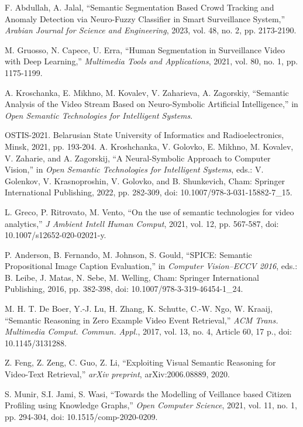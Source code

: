 \documentclass{article}
\begin{document}
\begin{multicols}{2}
\begin{thebibliography}{99}
F. Abdullah, A. Jalal, ``Semantic Segmentation Based Crowd Tracking and Anomaly Detection via Neuro-Fuzzy Classifier in Smart Surveillance System,'' \textit{Arabian Journal for Science and Engineering}, 2023, vol. 48, no. 2, pp. 2173-2190.

M. Gruosso, N. Capece, U. Erra, ``Human Segmentation in Surveillance Video with Deep Learning,'' \textit{Multimedia Tools and Applications}, 2021, vol. 80, no. 1, pp. 1175-1199.

A. Kroschanka, E. Mikhno, M. Kovalev, V. Zaharieva, A. Zagorskiy, ``Semantic Analysis of the Video Stream Based on Neuro-Symbolic Artificial Intelligence,'' in \textit{Open Semantic Technologies for Intelligent Systems}.

OSTIS-2021. Belarusian State University of Informatics and Radioelectronics, Minsk, 2021, pp. 193-204.
A. Kroshchanka, V. Golovko, E. Mikhno, M. Kovalev, V. Zaharie, and A. Zagorskij, ``A Neural-Symbolic Approach to Computer Vision,'' in \textit{Open Semantic Technologies for Intelligent Systems}, eds.: V. Golenkov, V. Krasnoproshin, V. Golovko, and B. Shunkevich, Cham: Springer International Publishing, 2022, pp. 282-309, doi: 10.1007/978-3-031-15882-7\_15.

L. Greco, P. Ritrovato, M. Vento, ``On the use of semantic technologies for video analytics,'' \textit{J Ambient Intell Human Comput}, 2021, vol. 12, pp. 567-587, doi: 10.1007/s12652-020-02021-y.

P. Anderson, B. Fernando, M. Johnson, S. Gould, ``SPICE: Semantic Propositional Image Caption Evaluation,'' in \textit{Computer Vision--ECCV 2016}, eds.: B. Leibe, J. Matas, N. Sebe, M. Welling, Cham: Springer International Publishing, 2016, pp. 382-398, doi: 10.1007/978-3-319-46454-1\_24.

M. H. T. De Boer, Y.-J. Lu, H. Zhang, K. Schutte, C.-W. Ngo, W. Kraaij, ``Semantic Reasoning in Zero Example Video Event Retrieval,'' \textit{ACM Trans. Multimedia Comput. Commun. Appl.}, 2017, vol. 13, no. 4, Article 60, 17 p., doi: 10.1145/3131288.

Z. Feng, Z. Zeng, C. Guo, Z. Li, ``Exploiting Visual Semantic Reasoning for Video-Text Retrieval,'' \textit{arXiv preprint}, arXiv:2006.08889, 2020.

S. Munir, S.I. Jami, S. Wasi, ``Towards the Modelling of Veillance based Citizen Profiling using Knowledge Graphs,'' \textit{Open Computer Science}, 2021, vol. 11, no. 1, pp. 294-304, doi: 10.1515/comp-2020-0209.


\end{thebibliography}
\end{multicols}
\end{document}
